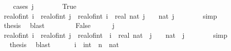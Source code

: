 \begin{isabellebody}
\ \ \isamarkupfalse%
\ {\isacharparenleft}{\kern0pt}cases\ {\isachardoublequoteopen}j\ {\isachargreater}{\kern0pt}\ {}{\isachardoublequoteclose}{\isacharparenright}{\kern0pt}\isanewline
\ \ \ \ \isamarkupfalse%
\ True\isanewline
\ \ \ \ \isamarkupfalse%
\ \isamarkupfalse%
\ {\isachardoublequoteopen}real{\isacharunderscore}{\kern0pt}of{\isacharunderscore}{\kern0pt}int\ i\ {\isacharslash}{\kern0pt}\ real{\isacharunderscore}{\kern0pt}of{\isacharunderscore}{\kern0pt}int\ j\ {\isacharequal}{\kern0pt}\ real{\isacharunderscore}{\kern0pt}of{\isacharunderscore}{\kern0pt}int\ i\ {\isacharslash}{\kern0pt}\ real\ {\isacharparenleft}{\kern0pt}nat\ j{\isacharparenright}{\kern0pt}\ {\isasymand}\ {}\ {\isacharless}{\kern0pt}\ nat\ j{\isachardoublequoteclose}\isanewline
\ \ \ \ \ \ \isamarkupfalse%
\ simp\isanewline
\ \ \ \ \isamarkupfalse%
\ \isamarkupfalse%
\ {\isacharquery}{\kern0pt}thesis\ \isamarkupfalse%
\ blast\isanewline
\ \ \isamarkupfalse%
\isanewline
\ \ \ \ \isamarkupfalse%
\ False\isanewline
\ \ \ \ \isamarkupfalse%
\ {\isacartoucheopen}j\ {\isasymnoteq}\ {}{\isacartoucheclose}\isanewline
\ \ \ \ \isamarkupfalse%
\ {\isachardoublequoteopen}real{\isacharunderscore}{\kern0pt}of{\isacharunderscore}{\kern0pt}int\ i\ {\isacharslash}{\kern0pt}\ real{\isacharunderscore}{\kern0pt}of{\isacharunderscore}{\kern0pt}int\ j\ {\isacharequal}{\kern0pt}\ real{\isacharunderscore}{\kern0pt}of{\isacharunderscore}{\kern0pt}int\ {\isacharparenleft}{\kern0pt}{\isacharminus}{\kern0pt}\ i{\isacharparenright}{\kern0pt}\ {\isacharslash}{\kern0pt}\ real\ {\isacharparenleft}{\kern0pt}nat\ {\isacharparenleft}{\kern0pt}{\isacharminus}{\kern0pt}\ j{\isacharparenright}{\kern0pt}{\isacharparenright}{\kern0pt}\ {\isasymand}\ {}\ {\isacharless}{\kern0pt}\ nat\ {\isacharparenleft}{\kern0pt}{\isacharminus}{\kern0pt}\ j{\isacharparenright}{\kern0pt}{\isachardoublequoteclose}\isanewline
\ \ \ \ \ \ \isamarkupfalse%
\ simp\isanewline
\ \ \ \ \isamarkupfalse%
\ \isamarkupfalse%
\ {\isacharquery}{\kern0pt}thesis\ \isamarkupfalse%
\ blast\isanewline
\ \ \isamarkupfalse%
\isanewline
{}\isamarkupfalse%
\isanewline
\ \ \isamarkupfalse%
\ i\ {\isacharcolon}{\kern0pt}{\isacharcolon}{\kern0pt}\ int\ \ n\ {\isacharcolon}{\kern0pt}{\isacharcolon}{\kern0pt}\ nat\isanewline

\end{isabellebody}
